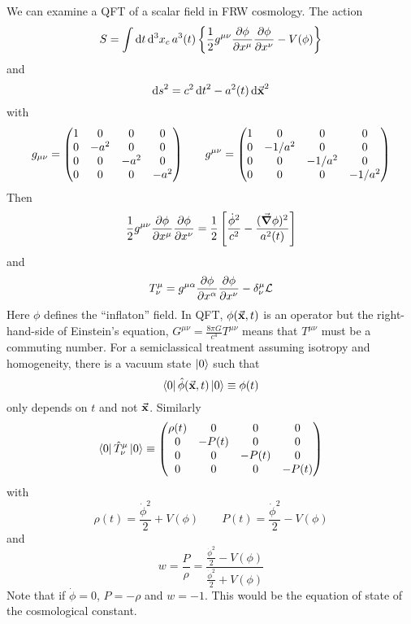 \documentclass[a4paper,twoside,master.tex]{subfiles}
\begin{document}
We can examine a QFT of a scalar field in FRW cosmology. The action
\begin{equation}
    S = \int \dd{t} \dd[3]{x_c} a^3(t) \left\{ \frac{1}{2} g^{\mu \nu} \pdv{\phi}{x^{\mu}} \pdv{\phi}{x^{\nu}} - V(\phi) \right\}
\end{equation}
and
\begin{equation}
    \dd{s}^2 = c^2 \dd{t}^2 - a^2(t) \dd{\va{x}}^2
\end{equation}
with
\begin{equation}
    g_{\mu \nu} = \mqty(\dmat[0]{1, -a^2, -a^2, -a^2}) \qquad g^{\mu \nu} = \mqty(\dmat[0]{1, -1/a^2, -1/a^2, -1/a^2})
\end{equation}
Then
\begin{equation}
    \frac{1}{2} g^{\mu \nu} \pdv{\phi}{x^{\mu}} \pdv{\phi}{x^{\nu}} = \frac{1}{2} \left[ \frac{\dot{\phi}^2}{c^2} - \frac{(\grad{\phi})^2}{a^2(t)} \right]
\end{equation}
and
\begin{equation}
    T^{\mu}_{\nu} = g^{\mu \alpha} \pdv{\phi}{x^{\alpha}} \pdv{\phi}{x^{\nu}} - \delta^{\mu}_{\nu} \mathcal{L}
\end{equation}
Here $ \phi $ defines the ``inflaton'' field. In QFT, $ \phi(\va{x}, t) $ is an operator but the right-hand-side of Einstein's equation, $ G^{\mu \nu} = \frac{8 \pi G}{c^4} T^{\mu \nu} $ means that $ T^{\mu \nu} $ must be a commuting number. For a semiclassical treatment assuming isotropy and homogeneity, there is a vacuum state $\ket{0} $ such that
\begin{equation}
    \bra{0} \hat{\phi}(\va{x}, t)\ket{0} \equiv \phi(t)
\end{equation}
only depends on $ t $ and not $ \va{x} $. Similarly
\begin{equation}
    \bra{0} \hat{T}^{\mu}_{\nu}\ket{0} \equiv \mqty(\dmat[0]{\rho(t), -P(t), -P(t), -P(t)})
\end{equation}
with
\begin{equation}
    \rho(t) = \frac{\dot{\phi}^2}{2} + V(\phi) \qquad P(t) = \frac{\dot{\phi}^2}{2} - V(\phi)
\end{equation}
and
\begin{equation}
    w = \frac{P}{\rho} = \frac{\frac{\dot{\phi}^2}{2} - V(\phi)}{\frac{\dot{\phi}^2}{2} + V(\phi)}
\end{equation}
Note that if $ \dot{\phi} = 0 $, $ P = - \rho $ and $ w = -1 $. This would be the equation of state of the cosmological constant.
\end{document}
